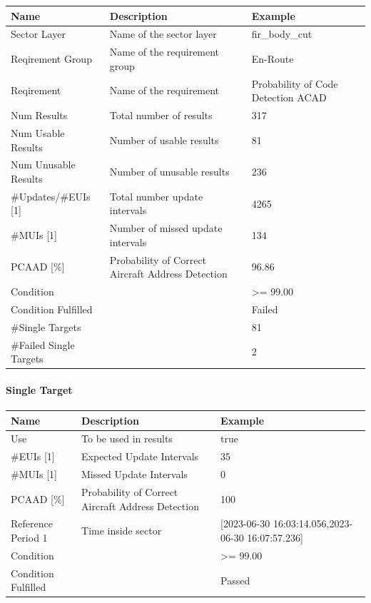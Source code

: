 \begin{center}
 \begin{table}[H]
  \begin{tabularx}{\textwidth}{ | l | X |  l | }
    \hline
    \textbf{Name} & \textbf{Description} & \textbf{Example} \\ \hline
    Sector Layer & Name of the sector layer & fir\_body\_cut \\ \hline
    Reqirement Group & Name of the requirement group & En-Route \\ \hline
    Reqirement & Name of the requirement & Probability of Code Detection ACAD \\ \hline
    Num Results & Total number of results & 317 \\ \hline
    Num Usable Results & Number of usable results & 81 \\ \hline
    Num Unusable Results & Number of unusable results & 236 \\ \hline
    \#Updates/\#EUIs [1] & Total number update intervals & 4265 \\ \hline
    \#MUIs [1] & Number of missed update intervals & 134 \\ \hline
    PCAAD [\%] & Probability of Correct Aircraft Address Detection & 96.86 \\ \hline
    Condition &  & >= 99.00 \\ \hline
    Condition Fulfilled &  & Failed \\ \hline
    \#Single Targets &  & 81 \\ \hline
    \#Failed Single Targets &  & 2 \\ \hline
\end{tabularx}
\end{table}
\end{center}

\paragraph{Single Target}

\begin{center}
 \begin{table}[H]
  \begin{tabularx}{\textwidth}{ | l | X |  l | }
    \hline
    \textbf{Name} & \textbf{Description} & \textbf{Example} \\ \hline
    Use & To be used in results & true \\ \hline
    \#EUIs [1] & Expected Update Intervals & 35 \\ \hline
    \#MUIs [1] & Missed Update Intervals & 0 \\ \hline
    PCAAD [\%] & Probability of Correct Aircraft Address Detection & 100 \\ \hline
    Reference Period 1 & Time inside sector & [2023-06-30 16:03:14.056,2023-06-30 16:07:57.236] \\ \hline
    Condition &  & >= 99.00 \\ \hline
    Condition Fulfilled &  & Passed \\ \hline
\end{tabularx}
\end{table}
\end{center}

